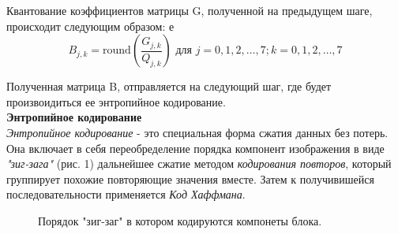 \documentclass{matmex-diploma-custom}
\begin{document}
Квантование коэффициентов матрицы  G, полученной на предыдущем шаге, происходит следующим образом:
е
$$B_{j,k} = \mathrm{round} \left( \frac{G_{j,k}}{Q_{j,k}} \right) \mbox{ для } j=0,1,2,\ldots,7; k=0,1,2,\ldots,7$$


  Полученная матрица B, отправляется на следующий шаг, где будет произвоидиться ее энтропийное кодирование.\\

\textbf{Энтропийное кодирование}\\

\emph{Энтропийное кодирование} - это специальная форма сжатия данных без потерь. Она включает в себя переобределение порядка компонент изображения в виде \emph{"зиг-зага"} (рис. 1) дальнейшее сжатие методом \emph{кодирования повторов}, который группирует похожие повторяющие значения вместе. Затем к получивишейся последовательности применяется \emph{Код Хаффмана}.\\

    \begin{figure}
      \centering
      \caption{Порядок "зиг-заг" в котором кодируются компонеты блока.}
    \end{figure}
\end{document}
